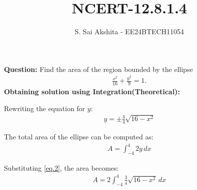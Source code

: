 \documentclass[journal,12pt,onecolumn]{IEEEtran}
\theoremstyle{remark}
\begin{document}

\vspace{3cm}

\title{NCERT-12.8.1.4}
\author{S. Sai Akshita - EE24BTECH11054}
\newpage
\maketitle
\bigskip

\renewcommand{\thefigure}{\theenumi}
\renewcommand{\thetable}{\theenumi}
\textbf{Question:} Find the area of the region bounded by the ellipse
\begin{align}
\frac{x^2}{16}+\frac{y^2}{9}=1. \label{eq.1}
\end{align}
\textbf{Obtaining solution using Integration(Theoretical):}

Rewriting the equation for $ y $:
\begin{align}
y = \pm \frac{3}{4} \sqrt{16 - x^2} \label{eq.2}
\end{align}

The total area of the ellipse can be computed as:
\begin{align}
A = \int_{-4}^{4} 2y \, dx
\end{align}

Substituting \ref{eq.2}, the area becomes:
\begin{align}
A = 2 \int_{-4}^{4} \frac{3}{4} \sqrt{16 - x^2} \, dx
\end{align}
\end{document}
